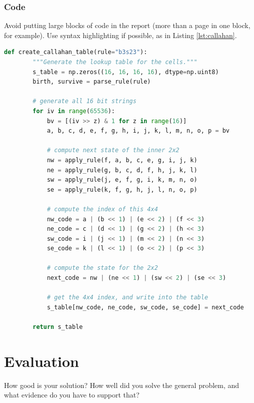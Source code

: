 \documentclass{l4proj}
\begin{document}
\subsection{Code}

Avoid putting large blocks of code in the report (more than a page in one block, for example). Use syntax highlighting if possible, as in Listing \ref{lst:callahan}.

\begin{lstlisting}[language=python, float, caption={The algorithm for packing the $3\times 3$ outer-totalistic binary CA successor rule into a 
    $16\times 16\times 16\times 16$ 4 bit lookup table, running an equivalent, notionally 16-state $2\times 2$ CA.}, label=lst:callahan]
    def create_callahan_table(rule="b3s23"):
        """Generate the lookup table for the cells."""        
        s_table = np.zeros((16, 16, 16, 16), dtype=np.uint8)
        birth, survive = parse_rule(rule)

        # generate all 16 bit strings
        for iv in range(65536):
            bv = [(iv >> z) & 1 for z in range(16)]
            a, b, c, d, e, f, g, h, i, j, k, l, m, n, o, p = bv

            # compute next state of the inner 2x2
            nw = apply_rule(f, a, b, c, e, g, i, j, k)
            ne = apply_rule(g, b, c, d, f, h, j, k, l)
            sw = apply_rule(j, e, f, g, i, k, m, n, o)
            se = apply_rule(k, f, g, h, j, l, n, o, p)

            # compute the index of this 4x4
            nw_code = a | (b << 1) | (e << 2) | (f << 3)
            ne_code = c | (d << 1) | (g << 2) | (h << 3)
            sw_code = i | (j << 1) | (m << 2) | (n << 3)
            se_code = k | (l << 1) | (o << 2) | (p << 3)

            # compute the state for the 2x2
            next_code = nw | (ne << 1) | (sw << 2) | (se << 3)

            # get the 4x4 index, and write into the table
            s_table[nw_code, ne_code, sw_code, se_code] = next_code

        return s_table

\end{lstlisting}

\chapter{Evaluation} 
How good is your solution? How well did you solve the general problem, and what evidence do you have to support that?
\end{document}
